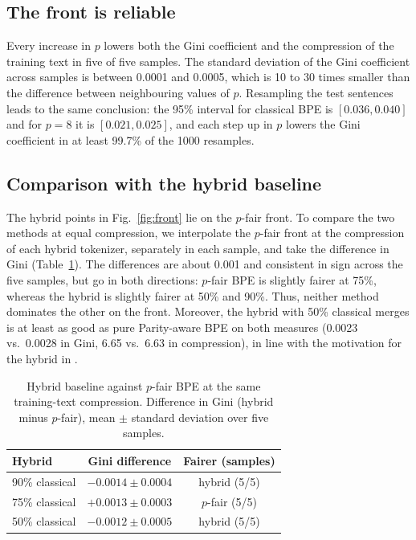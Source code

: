 \subsection{The front is reliable}

Every increase in $p$ lowers both the Gini coefficient and the compression of the training
text in five of five samples. The standard deviation of the Gini coefficient across samples
is between 0.0001 and 0.0005, which is 10 to 30 times smaller than the difference between
neighbouring values of $p$. Resampling the test sentences leads to the same conclusion: the
95\% interval for classical BPE is $[0.036,0.040]$ and for $p=8$ it is $[0.021,0.025]$, and
each step up in $p$ lowers the Gini coefficient in at least 99.7\% of the 1000 resamples.

\subsection{Comparison with the hybrid baseline}

The hybrid points in Fig.~\ref{fig:front} lie on the $p$-fair front. To compare the two
methods at equal compression, we interpolate the $p$-fair front at the compression of each
hybrid tokenizer, separately in each sample, and take the difference in Gini
(Table~\ref{tab:hybrid}). The differences are about 0.001 and consistent in sign across the
five samples, but go in both directions: $p$-fair BPE is slightly fairer at 75\%, whereas the
hybrid is slightly fairer at 50\% and 90\%. Thus, neither method dominates the other on the
front. Moreover, the hybrid with 50\% classical merges is at least as good as pure
Parity-aware BPE on both measures (0.0023 vs.\ 0.0028 in Gini, 6.65 vs.\ 6.63 in
compression), in line with the motivation for the hybrid in \citet{foroutan2026}.

\begin{table}[t]
\centering
\small
\begin{tabular}{lcc}
\toprule
Hybrid & Gini difference & Fairer (samples)\\
\midrule
90\% classical & $-0.0014\pm0.0004$ & hybrid (5/5)\\
75\% classical & $+0.0013\pm0.0003$ & $p$-fair (5/5)\\
50\% classical & $-0.0012\pm0.0005$ & hybrid (5/5)\\
\bottomrule
\end{tabular}
\caption{Hybrid baseline against $p$-fair BPE at the same training-text compression.
Difference in Gini (hybrid minus $p$-fair), mean $\pm$ standard deviation over five
samples.}
\label{tab:hybrid}
\end{table}

